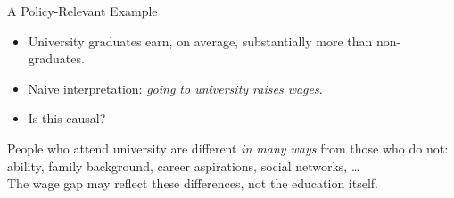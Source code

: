 \documentclass[aspectratio=169, 11pt]{beamer}
\begin{document}
\begin{frame}[t]{A Policy-Relevant Example}
\begin{itemize}
  \setlength\itemsep{0.5em}
  \item University graduates earn, on average, substantially more than non-graduates.
  \item Naive interpretation: \emph{going to university raises wages}.
  \item Is this causal?
\end{itemize}
\vspace{0.4em}
\begin{warningbox}
People who attend university are different \emph{in many ways} from those who do not:\\
ability, family background, career aspirations, social networks, \ldots\\[0.3em]
The wage gap may reflect these differences, not the education itself.
\end{warningbox}
\vspace{0.3em}
\end{frame}
\end{document}

